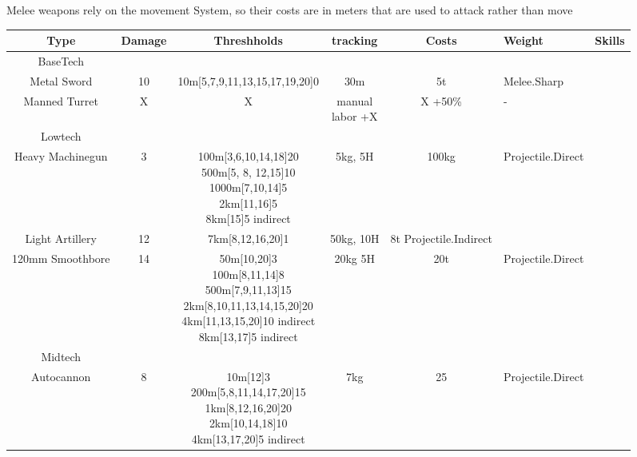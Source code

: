 Melee weapons rely on the movement System, so their costs are in meters that are used to attack rather than move\par
\begin{tabular}{c|ccccll}
    Type & Damage & Threshholds & tracking & Costs & Weight & Skills\\
    \hline BaseTech&&&&&\\
    Metal Sword & 10 & 10m[5,7,9,11,13,15,17,19,20]0 & 30m & 5t & Melee.Sharp \\
    Manned Turret & X & X & \makecell[l]{manual \\labor +X} &  X +50\% & - \\
    \hline Lowtech &&&&&\\
    Heavy Machinegun & 3 & \makecell[l]{100m[3,6,10,14,18]20\\
                                        500m[5, 8, 12,15]10\\
                                        1000m[7,10,14]5\\
                                        2km[11,16]5\\
                                        8km[15]5 indirect}
                                            & 5kg, 5H & 100kg & Projectile.Direct\\
    Light Artillery & 12 & 7km[8,12,16,20]1 & 50kg, 10H & 8t Projectile.Indirect \\
    120mm Smoothbore & 14 & \makecell[l]{50m[10,20]3\\
                                        100m[8,11,14]8\\
                                        500m[7,9,11,13]15\\
                                        2km[8,10,11,13,14,15,20]20\\
                                        4km[11,13,15,20]10 indirect\\
                                        8km[13,17]5 indirect}
                                            & 20kg 5H & 20t & Projectile.Direct\\
    \hline Midtech &&&&&\\
    Autocannon & 8 & \makecell[l]{10m[12]3\\
                                  200m[5,8,11,14,17,20]15\\
                                  1km[8,12,16,20]20\\
                                  2km[10,14,18]10 \\
                                  4km[13,17,20]5 indirect }
                                        & 7kg & 25 & Projectile.Direct\\
\end{tabular}
